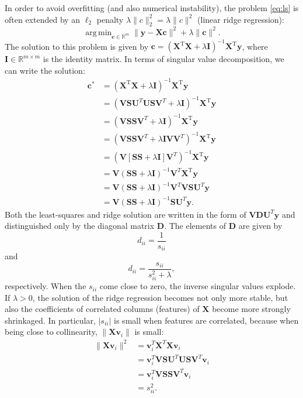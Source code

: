 \documentclass[11pt, a4paper, parskip=half*, bibliography=totoc, cleardoublepage=empty, final,
numbers=noenddot]{scrbook}
\DeclareMathOperator*{\argmin}{arg\,min}
\begin{document}
In order to avoid overfitting (and also numerical instability), the problem \ref{eq:ls} is often extended by an $\ell_2$ penalty \mbox{$\lambda \| c \|^2_2 = \lambda \| c \|^2$} (linear ridge regression):
\begin{equation}
\argmin_{\bm{c} \in \mathbb{R}^m} \| \bm{y} - \bm{X} \bm{c} \|^2+ \lambda \| \bm{c} \|^2.
\label{eq:ridge}
\end{equation}
The solution to this problem is given by  $\bm{c} = (\bm{X}^\text{T}\bm{X}+\lambda \bm{I})^{-1}\bm{X}^\text{T} \bm{y}$, where $\bm{I} \in \mathbb{R}^{m \times m}$ is the identity matrix.
In terms of singular value decomposition, we can write the solution:
\begin{align}
\bm{c}^* &= (\bm{X}^\text{T}\bm{X} + \lambda \bm{I})^{-1}\bm{X}^\text{T} \bm{y} \\
&= (\bm{V} \bm{S} \bm{U}^T \bm{U} \bm{S} \bm{V}^T + \lambda \bm{I})^{-1}\bm{X}^\text{T} \bm{y}\\
&= (\bm{V} \bm{S}\bm{S} \bm{V}^T + \lambda \bm{I})^{-1}\bm{X}^\text{T} \bm{y}\\
&= (\bm{V} \bm{S}\bm{S} \bm{V}^T + \lambda \bm{I}\bm{V} \bm{V}^T)^{-1}\bm{X}^\text{T} \bm{y}\\
&= (\bm{V} [\bm{S}\bm{S} + \lambda \bm{I}] \bm{V}^T)^{-1}\bm{X}^\text{T} \bm{y}\\
&= \bm{V} (\bm{S}\bm{S} + \lambda \bm{I})^{-1} \bm{V}^T \bm{X}^\text{T} \bm{y}\\
&= \bm{V} (\bm{S}\bm{S} + \lambda \bm{I})^{-1} \bm{V}^T \bm{V} \bm{S} \bm{U}^T \bm{y}\\
&= \bm{V} (\bm{S}\bm{S} + \lambda \bm{I})^{-1} \bm{S} \bm{U}^T \bm{y}.
\label{eq:ridge-svd}
\end{align}
Both the least-squares and ridge solution are written in the form of $\bm{V} \bm{D} \bm{U}^T \bm{y}$ and distinguished only by the diagonal matrix $\bm{D}$. The elements of $\bm{D}$ are given by
\begin{equation}
d_{ii} = \frac{1}{s_{ii}}
\end{equation}
and
\begin{equation}
d_{ii} = \frac{s_{ii}}{s_{ii}^2 + \lambda},
\end{equation}
respectively. When the $s_{ii}$ come close to zero, the inverse singular values explode. If $\lambda>0$, the solution of the ridge regression becomes not only more stable, but also the coefficients of correlated columns (features) of $\bm{X}$ become more strongly shrinkaged. In particular, $|s_{ii}|$ is small when features are correlated, because when being close to collinearity, $\| \bm{X} \bm{v}_i \|$ is small:
\begin{align}
\| \bm{X} \bm{v}_i \|^2 &= \bm{v}_i^T \bm{X}^T \bm{X}  \bm{v}_i \\
&= \bm{v}_i^T \bm{V} \bm{S} \bm{U}^T \bm{U} \bm{S} \bm{V}^T  \bm{v}_i \\ 
&= \bm{v}_i^T \bm{V} \bm{S}\bm{S} \bm{V}^T  \bm{v}_i \\
&= s_{ii}^2.  
\end{align}
\end{document}
